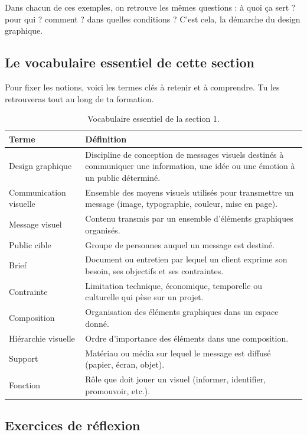 Dans chacun de ces exemples, on retrouve les mêmes questions : à quoi ça sert ? pour qui ? comment ? dans quelles conditions ? C'est cela, la démarche du design graphique.

\subsection{Le vocabulaire essentiel de cette section}

Pour fixer les notions, voici les termes clés à retenir et à comprendre. Tu les retrouveras tout au long de ta formation.

\begin{table}[h!]
\centering
\begin{tabular}{@{}p{4cm}p{10cm}@{}}
\toprule
\textbf{Terme} & \textbf{Définition} \\
\midrule
Design graphique & Discipline de conception de messages visuels destinés à communiquer une information, une idée ou une émotion à un public déterminé. \\
Communication visuelle & Ensemble des moyens visuels utilisés pour transmettre un message (image, typographie, couleur, mise en page). \\
Message visuel & Contenu transmis par un ensemble d'éléments graphiques organisés. \\
Public cible & Groupe de personnes auquel un message est destiné. \\
Brief & Document ou entretien par lequel un client exprime son besoin, ses objectifs et ses contraintes. \\
Contrainte & Limitation technique, économique, temporelle ou culturelle qui pèse sur un projet. \\
Composition & Organisation des éléments graphiques dans un espace donné. \\
Hiérarchie visuelle & Ordre d'importance des éléments dans une composition. \\
Support & Matériau ou média sur lequel le message est diffusé (papier, écran, objet). \\
Fonction & Rôle que doit jouer un visuel (informer, identifier, promouvoir, etc.). \\
\bottomrule
\end{tabular}
\caption{Vocabulaire essentiel de la section 1.}
\end{table}

\subsection{Exercices de réflexion}


